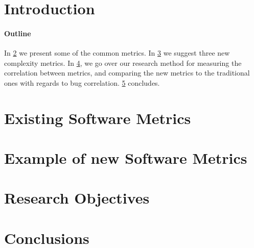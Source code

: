 \documentclass[10pt,twocolumn]{article}
\author{Tome Levy\\
	Department of Computer Science\\
	Technion---Israel Institute of Technology\\
	\texttt{\small \href{mailto:liorsam@campus.Technion.ac.il}{liorsam@campus.Technion.ac.il}}}
\date{\small Advisor: Prof.\ Yossi Gil}
\begin{document}
\maketitle
  
\begin{abstract}
	 
\end{abstract}

\section{Introduction}


\paragraph{Outline} 
In \cref{Section:metrics} we present some of the common metrics.
In \cref{Section:new-metrics} we suggest three new complexity metrics.
In \cref{Section:objectives}, we go over our research method for measuring
the correlation between metrics, and comparing the new metrics to the
traditional ones with regards to bug correlation.
\cref{Section:zz} concludes. 

\section{Existing Software Metrics}
\label{Section:metrics}
%

\section{Example of new Software Metrics}
\label{Section:new-metrics}
% 

\section{Research Objectives}
\label{Section:objectives}
%

\section{Conclusions}
\label{Section:zz}



%

\end{document}

